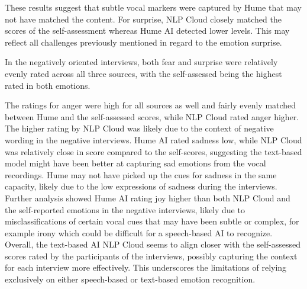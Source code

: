 These results suggest that subtle vocal markers were captured by Hume that may not have matched the content.
For surprise, NLP Cloud closely matched the scores of the self-assessment whereas Hume AI detected lower levels. This may reflect all challenges previously mentioned in regard to the emotion surprise.

In the negatively oriented interviews, both fear and surprise were relatively evenly rated across all three sources, with the self-assessed being the highest rated in both emotions.

The ratings for anger were high for all sources as well and fairly evenly matched between Hume and the self-assessed scores, while NLP Cloud rated anger higher. The higher rating by NLP Cloud was likely due to the context of negative wording in the negative interviews.
Hume AI rated sadness low, while NLP Cloud was relatively close in score compared to the self-scores, suggesting the text-based model might have been better at capturing sad emotions from the vocal recordings. Hume may not have picked up the cues for sadness in the same capacity, likely due to the low expressions of sadness during the interviews. 
Further analysis showed Hume AI rating joy higher than both NLP Cloud and the self-reported emotions in the negative interviews, likely due to misclassifications of certain vocal cues that may have been subtle or complex, for example irony which could be difficult for a speech-based AI to recognize. 
Overall, the text-based AI NLP Cloud seems to align closer with the self-assessed scores rated by the participants of the interviews, possibly capturing the context for each interview more effectively. This underscores the limitations of relying exclusively on either speech-based or text-based emotion recognition.